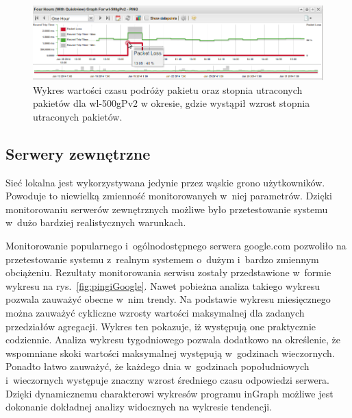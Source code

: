 \begin{figure}[ht]
  \caption{Wykres wartości czasu podróży pakietu oraz stopnia
    utraconych pakietów dla wl-500gPv2 w okresie, gdzie wystąpił wzrost stopnia utraconych pakietów.}
  \label{fig:pingRouteraDokladny}
  \centering
\includegraphics[width=1\textwidth]{img/pingiRouterDokladny.png}
\end{figure}

\subsection[Serwery zewnętrzne][Serwery zewnętrzne]{Serwery zewnętrzne}

Sieć lokalna jest wykorzystywana jedynie przez wąskie grono
użytkowników. Powoduje to niewielką zmienność monitorowanych w~niej
parametrów. Dzięki monitorowaniu serwerów zewnętrznych możliwe było
przetestowanie systemu w~dużo bardziej realistycznych warunkach.

Monitorowanie popularnego i~ogólnodostępnego serwera google.com
pozwoliło na przetestowanie systemu z~realnym systemem o~dużym
i~bardzo zmiennym obciążeniu. Rezultaty monitorowania serwisu zostały
przedstawione w~formie wykresu na rys.~\ref{fig:pingiGoogle}. Nawet
pobieżna analiza takiego wykresu pozwala zauważyć obecne w~nim
trendy. Na podstawie wykresu miesięcznego można zauważyć cykliczne
wzrosty wartości maksymalnej dla zadanych przedziałów
agregacji. Wykres ten pokazuje, iż występują one praktycznie
codziennie. Analiza wykresu tygodniowego pozwala dodatkowo na
określenie, że wspomniane skoki wartości maksymalnej występują
w~godzinach wieczornych. Ponadto łatwo zauważyć, że każdego dnia
w~godzinach popołudniowych i~wieczornych występuje znaczny wzrost
średniego czasu odpowiedzi serwera. Dzięki dynamicznemu charakterowi
wykresów programu inGraph możliwe jest dokonanie dokładnej analizy
widocznych na wykresie tendencji.

